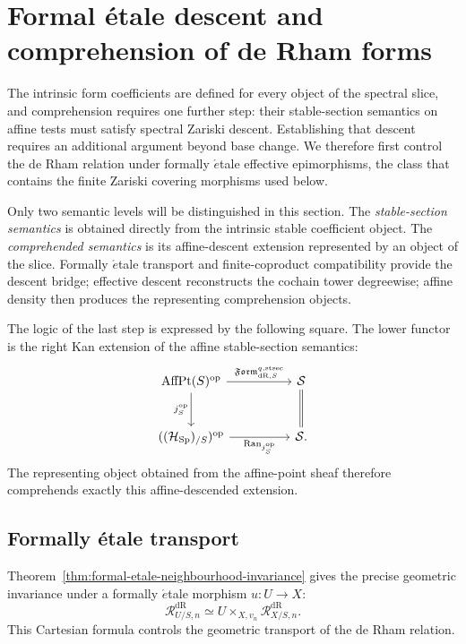 \section{Formal \texorpdfstring{\'etale}{etale} descent and comprehension of de Rham forms}
\label{sec:moduli-forms}

The intrinsic form coefficients are defined for every object of the spectral
slice, and comprehension requires one further step: their stable-section
semantics on affine tests must satisfy spectral Zariski descent. Establishing
that descent requires an additional argument beyond base change. We therefore
first control the de Rham relation under formally \(\acute{e}\)tale effective
epimorphisms, the class that contains the finite Zariski covering morphisms used
below.

Only two semantic levels will be distinguished in this section. The
\emph{stable-section semantics} is obtained directly from the intrinsic stable
coefficient object. The \emph{comprehended semantics} is its affine-descent
extension represented by an object of the slice. Formally \(\acute{e}\)tale
transport and finite-coproduct compatibility provide the descent bridge;
effective descent reconstructs the cochain tower degreewise; affine density
then produces the representing comprehension objects.

The logic of the last step is expressed by the following square. The lower
functor is the right Kan extension of the affine stable-section semantics:
\[
\begin{tikzcd}[column sep=huge,row sep=large]
  \operatorname{AffPt}(S)^{\op}
      \arrow[r,"{\mathfrak{Form}^{q,\mathrm{stsec}}_{\mathrm{dR},S}}"]
      \arrow[d,"j_S^{\op}"']
  &
  \mathcal S
  \\
  ((\mathcal H_{\Sp})_{/S})^{\op}
      \arrow[r,"{\operatorname{Ran}_{j_S^{\op}}}"']
  &
  \mathcal S
      \arrow[u,equal].
\end{tikzcd}
\]
The representing object obtained from the affine-point sheaf therefore
comprehends exactly this affine-descended extension.
\subsection{Formally \texorpdfstring{\'etale}{etale} transport}

Theorem~\ref{thm:formal-etale-neighbourhood-invariance} gives the precise geometric
invariance under a formally \(\acute{e}\)tale morphism \(u:U\to X\):
\[
  \mathcal R^{\mathrm{dR}}_{U/S,n}
  \simeq
  U\times_{X,v_n}\mathcal R^{\mathrm{dR}}_{X/S,n}.
\]
This Cartesian formula controls the geometric transport of the de Rham relation.

